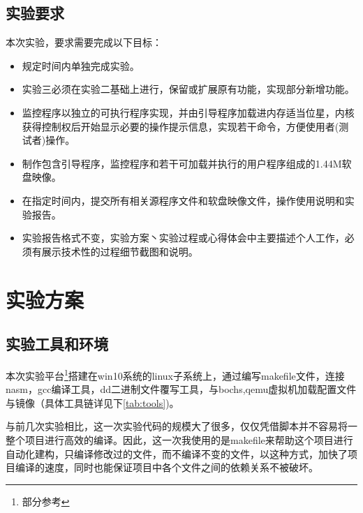 \documentclass[forprint]{WHUBachelor}
\begin{document}
\section{实验要求}

本次实验，要求需要完成以下目标：\\

\begin{itemize}
  \item 规定时间内单独完成实验。
  \item 实验三必须在实验二基础上进行，保留或扩展原有功能，实现部分新增功能。
  \item 监控程序以独立的可执行程序实现，并由引导程序加载进内存适当位星，内核获得控制权后开始显示必要的操作提示信息，实现若干命令，方便使用者(测试者)操作。
  \item 制作包含引导程序，监控程序和若干可加载并执行的用户程序组成的1.44M软盘映像。
  \item 在指定时间内，提交所有相关源程序文件和软盘映像文件，操作使用说明和实验报告。
  \item 实验报告格式不变，实验方案丶实验过程或心得体会中主要描述个人工作，必须有展示技术性的过程细节截图和说明。
\end{itemize}

\chapter{实验方案}

\section{实验工具和环境}

本次实验平台\footnote{部分参考\cite{于渊2009orange}}搭建在win10系统的linux子系统上，通过编写makefile文件，连接nasm，gcc编译工具，dd二进制文件覆写工具，与bochs,qemu虚拟机加载配置文件与镜像（具体工具链详见下\autoref{tab:tools})。

与前几次实验相比，这一次实验代码的规模大了很多，仅仅凭借脚本并不容易将一整个项目进行高效的编译。因此，这一次我使用的是makefile来帮助这个项目进行自动化建构，只编译修改过的文件，而不编译不变的文件，以这种方式，加快了项目编译的速度，同时也能保证项目中各个文件之间的依赖关系不被破坏。
\end{document}
